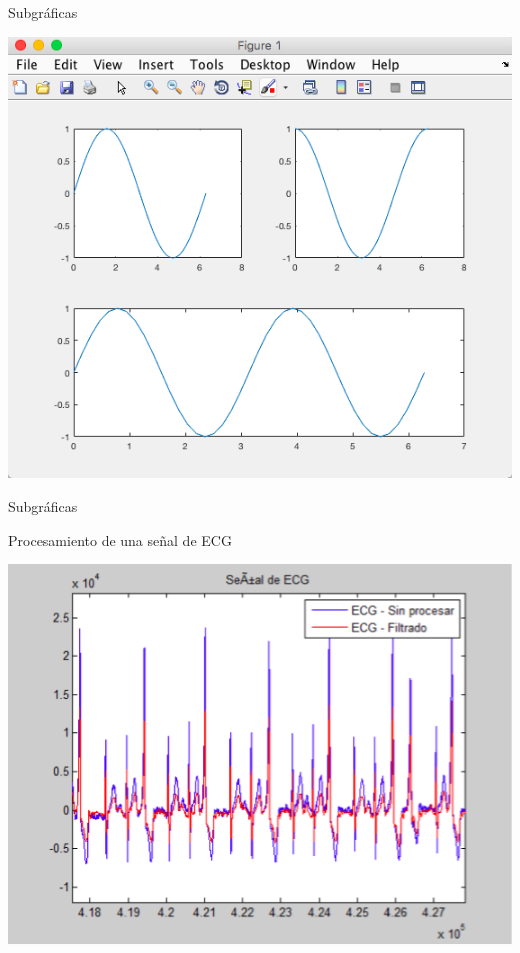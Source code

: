 \documentclass{bredelebeamer}
\begin{document}
\begin{frame}{Subgráficas}
\begin{center}
\includegraphics[scale=0.35]{images/pantalla21.png}
\end{center}
\end{frame}

\begin{frame}{Subgráficas}
\begin{center}
Procesamiento de una señal de ECG
\end{center}
\begin{center}
\includegraphics[scale=0.35]{images/img43.png}
\end{center}
\end{frame}
\end{document}
